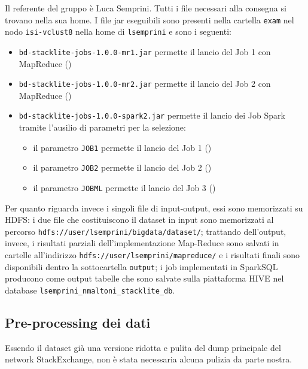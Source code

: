 \documentclass[
  a4paper,            %
  10pt                %
]{article}
\begin{document}
  Il referente del gruppo è Luca Semprini.
  Tutti i file necessari alla consegna si trovano nella sua home.
  I file jar eseguibili sono presenti nella cartella \texttt{exam} nel nodo \texttt{isi-vclust8} nella home di \texttt{lsemprini} e sono i seguenti:
  \begin{itemize}
    \item
      \texttt{bd-stacklite-jobs-1.0.0-mr1.jar} permette il lancio del Job 1 con MapReduce ()
    \item
      \texttt{bd-stacklite-jobs-1.0.0-mr2.jar} permette il lancio del Job 2 con MapReduce ()
    \item
      \texttt{bd-stacklite-jobs-1.0.0-spark2.jar} permette il lancio dei Job Spark tramite l'ausilio di parametri per la selezione:
      \begin{itemize}
        \item il parametro \texttt{JOB1} permette il lancio del Job 1 ()
        \item il parametro \texttt{JOB2} permette il lancio del Job 2 ()
        \item il parametro \texttt{JOBML} permette il lancio del Job 3 ()
      \end{itemize}
  \end{itemize}

  Per quanto riguarda invece i singoli file di input-output, essi sono memorizzati su HDFS\@:
  i due file che costituiscono il dataset in input sono memorizzati al percorso \texttt{hdfs://user/lsemprini/bigdata/dataset/};
  trattando dell’output, invece, i risultati parziali dell’implementazione Map-Reduce sono salvati in cartelle all’indirizzo \texttt{hdfs://user/lsemprini/mapreduce/}
  e i risultati finali sono disponibili dentro la sottocartella \texttt{output};
  i job implementati in SparkSQL producono come output tabelle che sono salvate sulla piattaforma HIVE nel database \texttt{lsemprini\_nmaltoni\_stacklite\_db}.

  \subsection{Pre-processing dei dati}\label{subsec:preprocessing}

  Essendo il dataset già una versione ridotta e pulita del dump principale del network StackExchange, non è stata necessaria alcuna pulizia da parte nostra.
\end{document}
